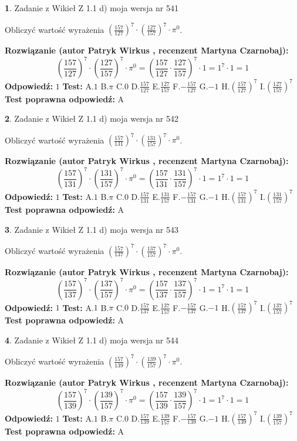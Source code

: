 \documentclass[12pt, a4paper]{article}
\theoremstyle{definition} %
\newtheorem{zad}{}
\newcommand{\zadStart}[1]{\begin{zad}#1\newline}
\newcommand{\zadStop}{\end{zad}}
\newcommand{\rozwStart}[2]{\noindent \textbf{Rozwiązanie (autor #1 , recenzent #2): }\newline}
\newcommand{\rozwStop}{\newline}
\newcommand{\odpStart}{\noindent \textbf{Odpowiedź:}\newline}
\newcommand{\odpStop}{\newline}
\newcommand{\testStart}{\noindent \textbf{Test:}\newline}
\newcommand{\testStop}{\newline}
\newcommand{\kluczStart}{\noindent \textbf{Test poprawna odpowiedź:}\newline}
\newcommand{\kluczStop}{\newline}
\begin{document}
\zadStart{Zadanie z Wikieł Z 1.1 d) moja wersja nr 541}

Obliczyć wartość wyrażenia $(\frac{157}{127})^{7} \cdot (\frac{127}{157})^{7} \cdot \pi^{0}$.
\zadStop
\rozwStart{Patryk Wirkus}{Martyna Czarnobaj}
$$(\frac{157}{127})^{7} \cdot (\frac{127}{157})^{7} \cdot \pi^{0} = (\frac{157}{127} \cdot \frac{127}{157})^{7} \cdot 1 = 1^{7} \cdot 1 = 1$$
\rozwStop
\odpStart
$1$
\odpStop
\testStart
A.$1$ B.$\pi$ C.$0$ D.$\frac{157}{127}$ E.$\frac{127}{157}$
F.$-\frac{157}{127}$ G.$-1$
H.$(\frac{157}{127})^{7}$
I.$(\frac{127}{157})^{7}$
\testStop
\kluczStart
A
\kluczStop



\zadStart{Zadanie z Wikieł Z 1.1 d) moja wersja nr 542}

Obliczyć wartość wyrażenia $(\frac{157}{131})^{7} \cdot (\frac{131}{157})^{7} \cdot \pi^{0}$.
\zadStop
\rozwStart{Patryk Wirkus}{Martyna Czarnobaj}
$$(\frac{157}{131})^{7} \cdot (\frac{131}{157})^{7} \cdot \pi^{0} = (\frac{157}{131} \cdot \frac{131}{157})^{7} \cdot 1 = 1^{7} \cdot 1 = 1$$
\rozwStop
\odpStart
$1$
\odpStop
\testStart
A.$1$ B.$\pi$ C.$0$ D.$\frac{157}{131}$ E.$\frac{131}{157}$
F.$-\frac{157}{131}$ G.$-1$
H.$(\frac{157}{131})^{7}$
I.$(\frac{131}{157})^{7}$
\testStop
\kluczStart
A
\kluczStop



\zadStart{Zadanie z Wikieł Z 1.1 d) moja wersja nr 543}

Obliczyć wartość wyrażenia $(\frac{157}{137})^{7} \cdot (\frac{137}{157})^{7} \cdot \pi^{0}$.
\zadStop
\rozwStart{Patryk Wirkus}{Martyna Czarnobaj}
$$(\frac{157}{137})^{7} \cdot (\frac{137}{157})^{7} \cdot \pi^{0} = (\frac{157}{137} \cdot \frac{137}{157})^{7} \cdot 1 = 1^{7} \cdot 1 = 1$$
\rozwStop
\odpStart
$1$
\odpStop
\testStart
A.$1$ B.$\pi$ C.$0$ D.$\frac{157}{137}$ E.$\frac{137}{157}$
F.$-\frac{157}{137}$ G.$-1$
H.$(\frac{157}{137})^{7}$
I.$(\frac{137}{157})^{7}$
\testStop
\kluczStart
A
\kluczStop



\zadStart{Zadanie z Wikieł Z 1.1 d) moja wersja nr 544}

Obliczyć wartość wyrażenia $(\frac{157}{139})^{7} \cdot (\frac{139}{157})^{7} \cdot \pi^{0}$.
\zadStop
\rozwStart{Patryk Wirkus}{Martyna Czarnobaj}
$$(\frac{157}{139})^{7} \cdot (\frac{139}{157})^{7} \cdot \pi^{0} = (\frac{157}{139} \cdot \frac{139}{157})^{7} \cdot 1 = 1^{7} \cdot 1 = 1$$
\rozwStop
\odpStart
$1$
\odpStop
\testStart
A.$1$ B.$\pi$ C.$0$ D.$\frac{157}{139}$ E.$\frac{139}{157}$
F.$-\frac{157}{139}$ G.$-1$
H.$(\frac{157}{139})^{7}$
I.$(\frac{139}{157})^{7}$
\testStop
\kluczStart
A
\kluczStop
\end{document}
